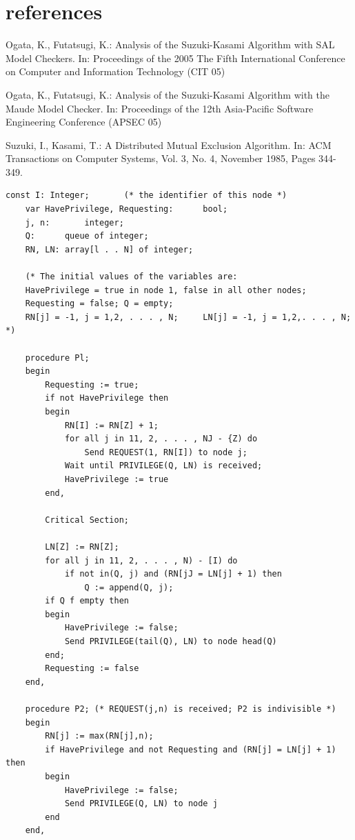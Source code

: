 \documentclass[a4paper,12pt]{llncs}
\begin{document}
\section{references}
\begin{thebibliography}{4}

Ogata, K., Futatsugi, K.: Analysis of the Suzuki-Kasami Algorithm with SAL Model Checkers. In: 
Proceedings of the 2005 The Fifth International Conference on Computer and Information Technology (CIT 05)

 Ogata, K., Futatsugi, K.: Analysis of the Suzuki-Kasami Algorithm with the Maude Model Checker. In: 
Proceedings of the 12th Asia-Pacific Software Engineering Conference (APSEC 05)

 Suzuki, I., Kasami, T.: A Distributed Mutual Exclusion Algorithm. In: 
ACM Transactions on Computer Systems, Vol. 3, No. 4, November 1985, Pages 344-349.


\end{thebibliography}

\newpage
\label{ref:SKA}

\begin{lstlisting}[label=some-code,caption=Suzuki and Kazami's algorithm]
const I: Integer;		(* the identifier of this node *)
	var HavePrivilege, Requesting:		bool;
	j, n:	 	integer;
	Q: 		queue of integer;
	RN, LN:	array[l . . N] of integer;

	(* The initial values of the variables are:
	HavePrivilege = true in node 1, false in all other nodes;
	Requesting = false; Q = empty;
	RN[j] = -1, j = 1,2, . . . , N;  	LN[j] = -1, j = 1,2,. . . , N; *)

	procedure Pl;
	begin
		Requesting := true;
		if not HavePrivilege then
		begin
			RN[I] := RN[Z] + 1;
			for all j in 11, 2, . . . , NJ - {Z) do
				Send REQUEST(1, RN[I]) to node j;
			Wait until PRIVILEGE(Q, LN) is received;
			HavePrivilege := true
		end,
	
		Critical Section;

		LN[Z] := RN[Z];
		for all j in 11, 2, . . . , N) - [I) do
			if not in(Q, j) and (RN[jJ = LN[j] + 1) then
				Q := append(Q, j);
		if Q f empty then
		begin
			HavePrivilege := false;
			Send PRIVILEGE(tail(Q), LN) to node head(Q)
		end;
		Requesting := false
	end,

	procedure P2; (* REQUEST(j,n) is received; P2 is indivisible *)
	begin
		RN[j] := max(RN[j],n);
		if HavePrivilege and not Requesting and (RN[j] = LN[j] + 1) then
		begin
			HavePrivilege := false;
			Send PRIVILEGE(Q, LN) to node j
		end
	end,

\end{lstlisting}
\end{document}
